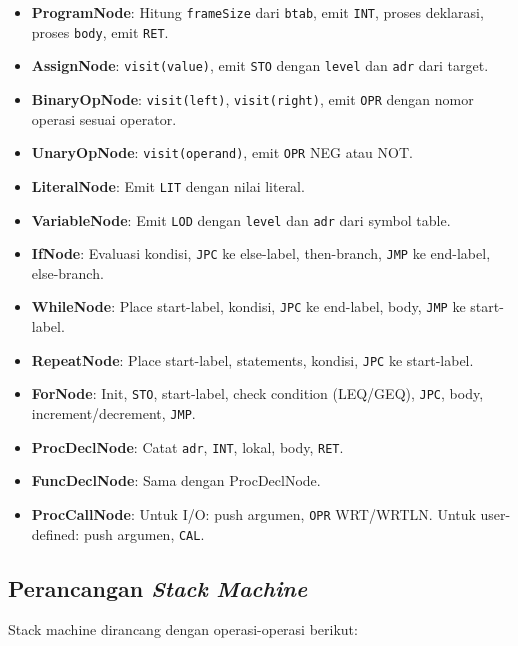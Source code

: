 \documentclass[12pt,a4paper]{article}
\begin{document}
\begin{itemize}
    \item \textbf{ProgramNode}: Hitung \texttt{frameSize} dari \texttt{btab},
        emit \texttt{INT}, proses deklarasi, proses \texttt{body}, emit
        \texttt{RET}.
    \item \textbf{AssignNode}: \texttt{visit(value)}, emit \texttt{STO}
        dengan \texttt{level} dan \texttt{adr} dari target.
    \item \textbf{BinaryOpNode}: \texttt{visit(left)}, \texttt{visit(right)},
        emit \texttt{OPR} dengan nomor operasi sesuai operator.
    \item \textbf{UnaryOpNode}: \texttt{visit(operand)}, emit \texttt{OPR}
        NEG atau NOT.
    \item \textbf{LiteralNode}: Emit \texttt{LIT} dengan nilai literal.
    \item \textbf{VariableNode}: Emit \texttt{LOD} dengan \texttt{level} dan
        \texttt{adr} dari symbol table.
    \item \textbf{IfNode}: Evaluasi kondisi, \texttt{JPC} ke else-label,
        then-branch, \texttt{JMP} ke end-label, else-branch.
    \item \textbf{WhileNode}: Place start-label, kondisi, \texttt{JPC} ke
        end-label, body, \texttt{JMP} ke start-label.
    \item \textbf{RepeatNode}: Place start-label, statements, kondisi,
        \texttt{JPC} ke start-label.
    \item \textbf{ForNode}: Init, \texttt{STO}, start-label, check condition
        (LEQ/GEQ), \texttt{JPC}, body, increment/decrement, \texttt{JMP}.
    \item \textbf{ProcDeclNode}: Catat \texttt{adr}, \texttt{INT}, lokal,
        body, \texttt{RET}.
    \item \textbf{FuncDeclNode}: Sama dengan ProcDeclNode.
    \item \textbf{ProcCallNode}: Untuk I/O: push argumen, \texttt{OPR} WRT/WRTLN.
        Untuk user-defined: push argumen, \texttt{CAL}.
\end{itemize}

\subsection{Perancangan \textit{Stack Machine}}

Stack machine dirancang dengan operasi-operasi berikut:
\end{document}
